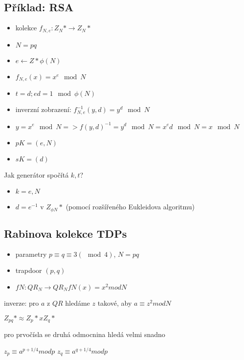 \documentclass{article}
\begin{document}
\subsection{Příklad: RSA}
\begin{itemize}
\item    kolekce $f_{N,e}: Z_{N}* \rightarrow Z_{N}*$
\item    $N = pq$
\item    $e \leftarrow Z* \phi(N)$
\item    $f_{N,e}(x) = x^e \mod N$
\item    $t = d; ed = 1 \mod \phi(N)$

\item    inverzní zobrazení:
    $f_{N,e}^{-1}(y,d) = y^d \mod N$

\item    $y = x^e \mod N => f(y,d)^{-1} = y^d \mod N = x^ed \mod N = x \mod N$

\item    $pK = (e,N)$

\item    $sK = (d)$
\end{itemize}

Jak generátor spočítá $k,t$?
\begin{itemize}
\item    $k = e,N$
\item    $d = e^{-1}$ v $Z_{\phi N}*$ (pomocí rozšířeného Eukleidova algoritmu)
\end{itemize}





\subsection{Rabinova kolekce TDPs}
\begin{itemize}
\item    parametry $p \equiv q \equiv 3 (\mod 4)$, $N = pq$
\item    trapdoor $(p,q)$
\item    $fN: QR_N \rightarrow QR_N fN(x) = x^2 mod N$
\end{itemize}

    inverze:
        pro $a$ z $QR$ hledáme $z$ takové, aby $a \equiv z^2 mod N$

        $Z_{pq}* \approx Z_p* x Z_q*$

        pro prvočísla se druhá odmocnina hledá velmi snadno

        $z_p \equiv a^{p+1 / 4} mod p$
        $z_q \equiv a^{q+1 / 4} mod p$
\end{document}
